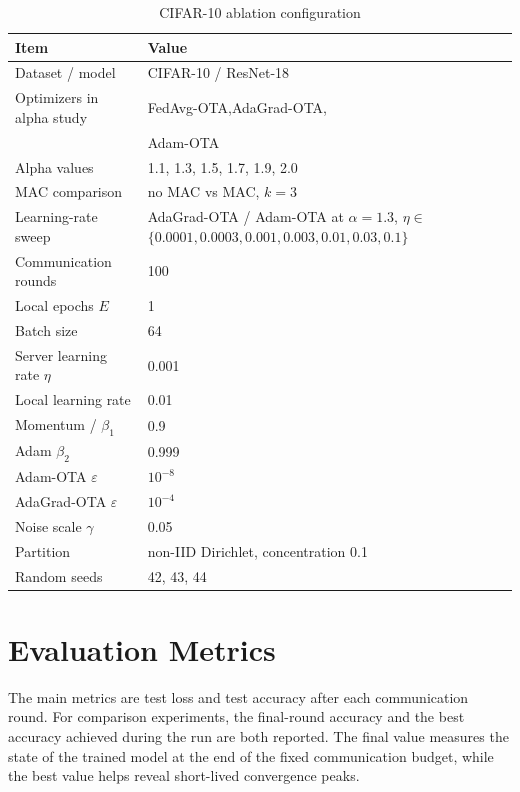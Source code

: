 \begin{table}[!htbp]
    \centering
    \caption{CIFAR-10 ablation configuration}
    \label{tab:config-ablation}
    \begin{tabular}{p{}|p{}}
        \hline
        Item & Value \\
        \hline
        Dataset / model & CIFAR-10 / ResNet-18 \\
        Optimizers in alpha study & FedAvg-OTA,AdaGrad-OTA,\\
        & Adam-OTA \\
        Alpha values & 1.1, 1.3, 1.5, 1.7, 1.9, 2.0 \\
        MAC comparison & no MAC vs MAC, $k=3$ \\
        Learning-rate sweep & AdaGrad-OTA / Adam-OTA at $\alpha=1.3$,
        $\eta\in$$\{0.0001,0.0003,0.001,0.003,0.01,0.03,0.1\}$ \\
        Communication rounds & 100 \\
        Local epochs $E$ & 1 \\
        Batch size & 64 \\
        Server learning rate $\eta$ & 0.001 \\
        Local learning rate & 0.01 \\
        Momentum / $\beta_1$ & 0.9 \\
        Adam $\beta_2$ & 0.999 \\
        Adam-OTA $\varepsilon$ & $10^{-8}$ \\
        AdaGrad-OTA $\varepsilon$ & $10^{-4}$ \\
        Noise scale $\gamma$ & 0.05 \\
        Partition & non-IID Dirichlet, concentration 0.1 \\
        Random seeds & 42, 43, 44 \\
        \hline
    \end{tabular}
\end{table}

\section{Evaluation Metrics}
The main metrics are test loss and test accuracy after each communication
round. For comparison experiments, the final-round accuracy and the best
accuracy achieved during the run are both reported. The final value measures
the state of the trained model at the end of the fixed communication budget,
while the best value helps reveal short-lived convergence peaks.


